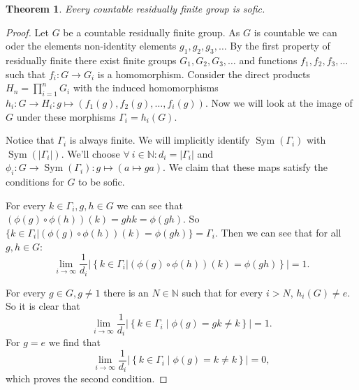 \documentclass[a4paper]{memoir}
\newcommand{\N}{\mathbb{N}}
\newtheorem{theorem}{Theorem}
\DeclareMathOperator{\sym}{Sym}
\begin{document}
    \begin{theorem}
        Every countable residually finite group is sofic.
    \end{theorem}
    \begin{proof}
        Let $G$ be a countable residually finite group. As $G$ is countable we can oder the elements non-identity elements $g_1, g_2, g_3, \dots$
        By the first property of residually finite there exist finite groups $G_1, G_2, G_3, \dots$ and functions $f_1, f_2, f_3, \dots$ such that $f_i: G \to G_i$ is a homomorphism. Consider the direct products $H_n = \prod_{i = 1}^n G_i$ with the induced homomorphisms $h_i: G \to H_i: g \mapsto (f_1(g), f_2(g), \dots, f_i(g))$. Now we will look at the image of $G$ under these morphisms $\Gamma_i = h_i(G)$.


        Notice that $\Gamma_i$ is always finite. We will implicitly identify $\sym(\Gamma_i)$ with $\sym(|\Gamma_i|)$.
        We'll choose $\forall\ i \in \N: d_i = |\Gamma_i|$ and $\phi_i: G \to \sym(\Gamma_i): g \mapsto (a \mapsto ga)$. We claim that these maps satisfy the conditions for $G$ to be sofic.

        For every $k \in \Gamma_i, g, h \in G$ we can see that $(\phi(g) \circ \phi(h))(k) = ghk = \phi(gh)$. So $\{k \in \Gamma_i| (\phi(g) \circ \phi(h))(k) = \phi(gh)\} = \Gamma_i$.
        Then we can see that for all $g,h \in G$:
        $$\lim_{i\to \infty} \frac{1}{d_i} \left|\left\{k \in \Gamma_i| (\phi(g) \circ \phi(h))(k) = \phi(gh)\right\}\right| = 1.$$

        For every $g \in G, g\ne 1$ there is an $N \in \N$ such that for every $i > N$, $h_i(G) \ne e$. So it is clear that 
        $$\lim_{i \to \infty} \frac{1}{d_i} \left| \left\{k \in \Gamma_i \mid \phi(g) = gk \ne k\right\}\right| = 1.$$
        For $g = e$ we find that 
        $$\lim_{i \to \infty} \frac{1}{d_i} \left| \left\{k \in \Gamma_i \mid \phi(g) = k \ne k\right\}\right| = 0,$$
        which proves the second condition. 

    \end{proof}
    \printbibliography
\end{document}
